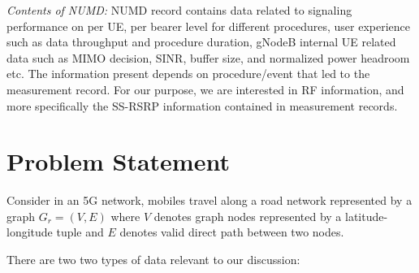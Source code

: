 \documentclass[conference, 10pt]{IEEEtran}
\begin{document}
{\em Contents of NUMD:} NUMD record contains data related to signaling performance on
per UE, per bearer level for different procedures, user experience such as data
throughput and procedure duration, gNodeB internal UE related data such as MIMO
decision, SINR, buffer size, and normalized power headroom etc.  The information
present depends on procedure/event that led to the measurement record. For our
purpose, we are interested in RF information, and more specifically the SS-RSRP information contained in measurement records. 
%
%
%
%
%





\section{Problem Statement} 
\label{sec:ps}

Consider in an 5G network, mobiles travel along a road network represented by a graph $G_r=(V,E)$ where $V$
denotes graph nodes represented by a latitude-longitude tuple and $E$ denotes
valid direct path between two nodes.

There are two two types of data relevant to our discussion:
\end{document}
